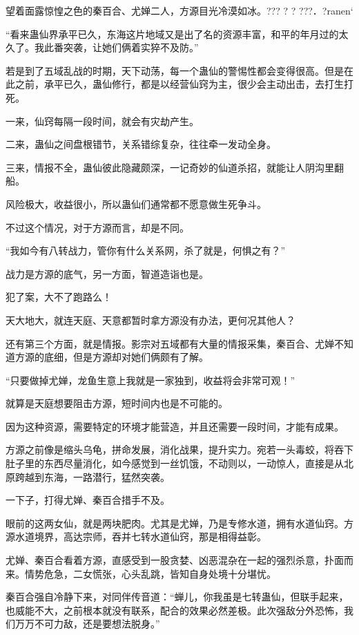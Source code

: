 
\begin{this_body}

望着面露惊惶之色的秦百合、尤婵二人，方源目光冷漠如冰。??? ? ?  ???．?ranen`

“看来蛊仙界承平已久，东海这片地域又是出了名的资源丰富，和平的年月过的太久了。我此番突袭，让她们俩着实猝不及防。”

若是到了五域乱战的时期，天下动荡，每一个蛊仙的警惕性都会变得很高。但是在此之前，承平已久，蛊仙修行，都是以经营仙窍为主，很少会主动出击，去打生打死。

一来，仙窍每隔一段时间，就会有灾劫产生。

二来，蛊仙之间盘根错节，关系错综复杂，往往牵一发动全身。

三来，情报不全，蛊仙彼此隐藏颇深，一记奇妙的仙道杀招，就能让人阴沟里翻船。

风险极大，收益很小，所以蛊仙们通常都不愿意做生死争斗。

不过这个情况，对于方源而言，却是不同。

“我如今有八转战力，管你有什么关系网，杀了就是，何惧之有？”

战力是方源的底气，另一方面，智道造诣也是。

犯了案，大不了跑路么！

天大地大，就连天庭、天意都暂时拿方源没有办法，更何况其他人？

还有第三个方面，就是情报。影宗对五域都有大量的情报采集，秦百合、尤婵不知道方源的底细，但是方源却对她们俩颇有了解。

“只要做掉尤婵，龙鱼生意上我就是一家独到，收益将会非常可观！”

就算是天庭想要阻击方源，短时间内也是不可能的。

因为这种资源，需要特定的环境才能营造，并且还需要一段时间，才能有成果。

方源之前像是缩头乌龟，拼命发展，消化战果，提升实力。宛若一头毒蛟，将吞下肚子里的东西尽量消化，如今感觉到一丝饥饿，不动则以，一动惊人，直接是从北原跨越到东海，一路潜行，猛然突袭。

一下子，打得尤婵、秦百合措手不及。

眼前的这两女仙，就是两块肥肉。尤其是尤婵，乃是专修水道，拥有水道仙窍。方源水道境界，高达宗师，吞并七转水道仙窍，那是相得益彰。

尤婵、秦百合看着方源，直感受到一股贪婪、凶恶混杂在一起的强烈杀意，扑面而来。情势危急，二女慌张，心头乱跳，皆知自身处境十分堪忧。

秦百合强自冷静下来，对同伴传音道：“蝉儿，你我虽是七转蛊仙，但联手起来，也威能不大，之前根本就没有联系，配合的效果必然差极。此次强敌分外恐怖，我们万万不可力敌，还是要想法脱身。”


\end{this_body}

